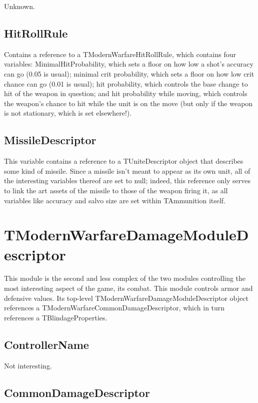 \documentclass{article}
\begin{document}
Unknown.

\subsection{HitRollRule}

Contains a reference to a TModernWarfareHitRollRule, which contains four variables: MinimalHitProbability, which sets a floor on how low a shot's accuracy can go (0.05 is usual); minimal crit probability, which sets a floor on how low crit chance can go (0.01 is usual); hit probability, which controls the base change to hit of the weapon in question; and hit probability while moving, which controls the weapon's chance to hit while the unit is on the move (but only if the weapon is not stationary, which is set elsewhere!).

\subsection{MissileDescriptor}

This variable contains a reference to a TUniteDescriptor object that describes some kind of missile. Since a missile isn't meant to appear as its own unit, all of the interesting variables thereof are set to null; indeed, this reference only serves to link the art assets of the missile to those of the weapon firing it, as all variables like accuracy and salvo size are set within TAmmunition itself.

\section{TModernWarfareDamageModuleDescriptor}

This module is the second and less complex of the two modules controlling the most interesting aspect of the game, its combat. This module controls armor and defensive values. Its top-level TModernWarfareDamageModuleDescriptor object references a TModernWarfareCommonDamageDescriptor, which in turn references a TBlindageProperties.

\subsection{ControllerName}

Not interesting.

\subsection{CommonDamageDescriptor}
\end{document}
